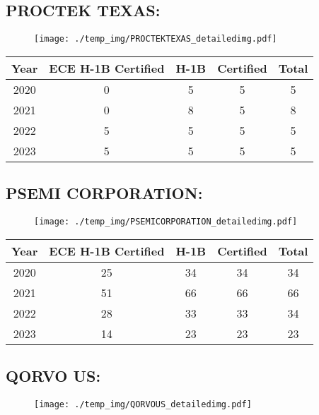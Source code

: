 \documentclass{article}%
\begin{document}
%
\newpage%
\subsection{PROCTEK TEXAS:}%
\label{subsec:PROCTEKTEXAS}%
\label{PROCTEKTEXASdetailed}%


\begin{figure}[htbp]%
\centering%
\texttt{[image: ./temp\_img/PROCTEKTEXAS\_detailedimg.pdf]}%
\end{figure}

%
\begin{longtable}{c|c|c|c|c}%
\hline%
Year&ECE H{-}1B Certified&H{-}1B&Certified&Total\\%
\hline%
2020&0&5&5&5\\%
\hline%
2021&0&8&5&8\\%
\hline%
2022&5&5&5&5\\%
\hline%
2023&5&5&5&5\\%
\hline%
\end{longtable}

%
\newpage%
\subsection{PSEMI CORPORATION:}%
\label{subsec:PSEMICORPORATION}%
\label{PSEMICORPORATIONdetailed}%


\begin{figure}[htbp]%
\centering%
\texttt{[image: ./temp\_img/PSEMICORPORATION\_detailedimg.pdf]}%
\end{figure}

%
\begin{longtable}{c|c|c|c|c}%
\hline%
Year&ECE H{-}1B Certified&H{-}1B&Certified&Total\\%
\hline%
2020&25&34&34&34\\%
\hline%
2021&51&66&66&66\\%
\hline%
2022&28&33&33&34\\%
\hline%
2023&14&23&23&23\\%
\hline%
\end{longtable}

%
\newpage%
\subsection{QORVO US:}%
\label{subsec:QORVOUS}%
\label{QORVOUSdetailed}%


\begin{figure}[htbp]%
\centering%
\texttt{[image: ./temp\_img/QORVOUS\_detailedimg.pdf]}%
\end{figure}
\end{document}
